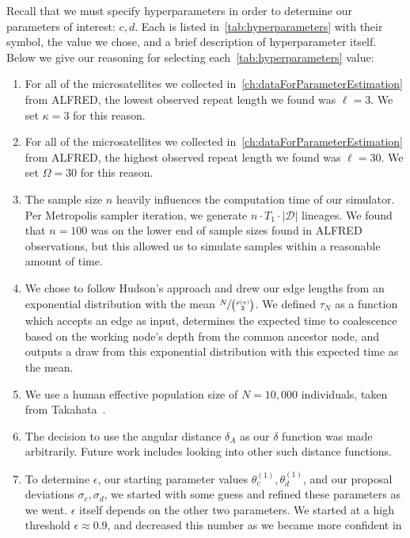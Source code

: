 Recall that we must specify hyperparameters in order to determine our parameters of interest: $c, d$.
Each is listed in~\autoref{tab:hyperparameters} with their symbol, the value we chose, and a brief description of
hyperparameter itself.
Below we give our reasoning for selecting each~\autoref{tab:hyperparameters} value:
\begin{enumerate}
    \item For all of the microsatellites we collected in~\autoref{ch:dataForParameterEstimation} from ALFRED, the
        lowest observed repeat length we found was $\ell=3$.
        We set $\kappa = 3$ for this reason.
    \item For all of the microsatellites we collected in~\autoref{ch:dataForParameterEstimation} from ALFRED, the
        highest observed repeat length we found was $\ell=30$.
        We set $\Omega = 30$ for this reason.
    \item The sample size $n$ heavily influences the computation time of our simulator.
        Per Metropolis sampler iteration, we generate $n \cdot T_1 \cdot | \mathcal{D} |$ lineages.
        We found that $n=100$ was on the lower end of sample sizes found in ALFRED observations, but this allowed us
        to simulate samples within a reasonable amount of time.
    \item We chose to follow Hudson's approach and drew our edge lengths from an exponential distribution with the mean
        $\sfrac{N}{\binom{\rho(e)}{2}}$.
        We defined $\tau_N$ as a function which accepts an edge as input, determines the expected time to coalescence
        based on the working node's depth from the common ancestor node, and outputs a draw from this exponential
        distribution with this expected time as the mean.
    \item We use a human effective population size of $N=10,000$ individuals, taken from
        Takahata~\cite{takahataAllelicGenealogyHuman1993}.
    \item The decision to use the angular distance $\delta_A$ as our $\delta$ function was made arbitrarily.
        Future work includes looking into other such distance functions.
    \item To determine $\epsilon$, our starting parameter values $\theta^{(1)}_c, \theta^{(1)}_d$, and our proposal
        deviations $\sigma_c, \sigma_d$, we started with some guess and refined these parameters as we went.
        $\epsilon$ itself depends on the other two parameters.
        We started at a high threshold $\epsilon \approx 0.9$, and decreased this number as we became more confident in

\end{enumerate}
